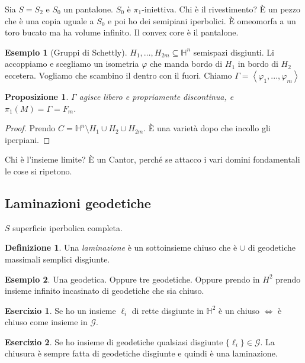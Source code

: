 \documentclass[a4paper]{article}
\newtheorem{proposition}{Proposizione}
\theoremstyle{definition}
\newtheorem{definition}{Definizione}
\newtheorem{exercise}{Esercizio}
\newtheorem{example}{Esempio}
\begin{document}
    Sia $S = S_2$ e $S_0$ un pantalone. $S_0$ è $\pi_1$-iniettiva. Chi è il rivestimento? È un pezzo che è una copia uguale a $S_0$ e poi ho dei semipiani iperbolici. È omeomorfa a un toro bucato ma ha volume infinito. Il convex core è il pantalone.

    \begin{example}[Gruppi di Schettly]
        $H_1, \ldots, H_{2 m} \subseteq \mathbb H^n$ semispazi disgiunti. Li accoppiamo e scegliamo un isometria $\varphi$ che manda bordo di $H_{1}$ in bordo di $H_{2}$ eccetera. Vogliamo che scambino il dentro con il fuori. Chiamo $\Gamma = \left<\varphi_1, ..., \varphi_m\right>$
    \end{example}

    \begin{proposition}
        $\Gamma$ agisce libero e propriamente discontinua, e $\pi_{1} (M) = \Gamma = F_{m}$.
    \end{proposition}

    \begin{proof}
        Prendo $C = \mathbb H^n \setminus H_1 \cup H_2 \cup H_{2 m}$. È una varietà dopo che incollo gli iperpiani.
    \end{proof}

    Chi è l'insieme limite? È un Cantor, perché se attacco i vari domini fondamentali le cose si ripetono.

\subsection{Laminazioni geodetiche}
    $S$ superficie iperbolica completa.
    \begin{definition}
        Una \emph{laminazione} è un sottoinsieme chiuso che è $\cup$ di geodetiche massimali semplici disgiunte.
    \end{definition}

    \begin{example}
        Una geodetica. Oppure tre geodetiche. Oppure prendo in $H^2$ prendo insieme infinito incasinato di geodetiche che sia chiuso.
    \end{example}

    \begin{exercise}
        Se ho un insieme $\ell_i$ di rette disgiunte in $\mathbb H^2$ è un chiuso $\iff$ è chiuso come insieme in $\mathcal G$.
    \end{exercise}

    \begin{exercise}
        Se ho insieme di geodetiche qualsiasi disgiunte $\{\ell_i\} \in \mathcal G$. La chiusura è sempre fatta di geodetiche disgiunte e quindi è una laminazione.
    \end{exercise}
\end{document}
